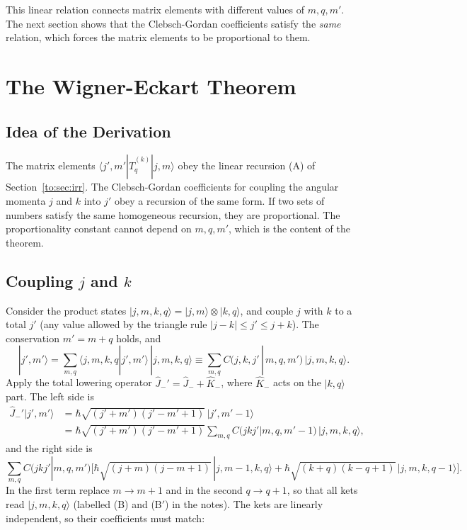 \documentclass[11pt,a4paper]{article}
\begin{document}
This linear relation connects matrix elements with different values of $m,q,m'$. The next section shows that the Clebsch-Gordan coefficients satisfy the \emph{same} relation, which forces the matrix elements to be proportional to them.

\section{The Wigner-Eckart Theorem}
\label{to:sec:we}

\subsection{Idea of the Derivation}
The matrix elements $\langle j',m'|\hat T^{(k)}_q|j,m\rangle$ obey the linear recursion (A) of Section~\ref{to:sec:irr}. The Clebsch-Gordan coefficients for coupling the angular momenta $j$ and $k$ into $j'$ obey a recursion of the same form. If two sets of numbers satisfy the same homogeneous recursion, they are proportional. The proportionality constant cannot depend on $m,q,m'$, which is the content of the theorem.

\subsection{Coupling \texorpdfstring{$j$}{j} and \texorpdfstring{$k$}{k}}
Consider the product states $|j,m,k,q\rangle=|j,m\rangle\otimes|k,q\rangle$, and couple $j$ with $k$ to a total $j'$ (any value allowed by the triangle rule $|j-k|\le j'\le j+k$). The conservation $m'=m+q$ holds, and
\[
|j',m'\rangle=\sum_{m,q}\langle j,m,k,q|j',m'\rangle\,|j,m,k,q\rangle\equiv\sum_{m,q}C(j,k,j'\,|\,m,q,m')\,|j,m,k,q\rangle .
\]
Apply the total lowering operator $\hat J_-'=\hat J_-+\hat K_-$, where $\hat K_-$ acts on the $|k,q\rangle$ part. The left side is
\begin{align*}
\hat J_-'|j',m'\rangle&=\hbar\sqrt{(j'+m')(j'-m'+1)}\,|j',m'-1\rangle\\
&=\hbar\sqrt{(j'+m')(j'-m'+1)}\sum_{m,q}C(jkj'|m,q,m'-1)\,|j,m,k,q\rangle ,
\end{align*}
and the right side is
\[
\sum_{m,q}C(jkj'|m,q,m')\Big[\hbar\sqrt{(j+m)(j-m+1)}\,|j,m-1,k,q\rangle+\hbar\sqrt{(k+q)(k-q+1)}\,|j,m,k,q-1\rangle\Big].
\]
In the first term replace $m\to m+1$ and in the second $q\to q+1$, so that all kets read $|j,m,k,q\rangle$ (labelled (B) and (B$'$) in the notes). The kets are linearly independent, so their coefficients must match:
\end{document}
